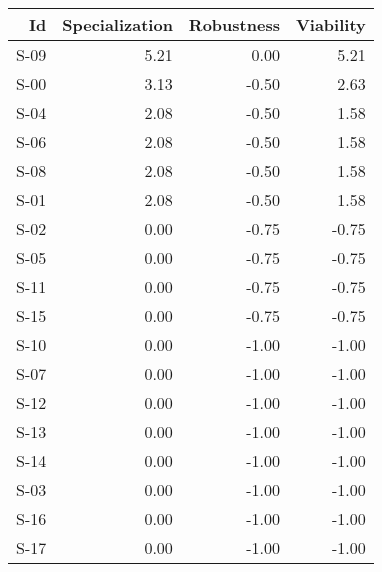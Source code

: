 \begin{tabular}{ | r | r | r | r | }
    \hline
                    Id  &  Specialization  &      Robustness  &       Viability  \\
    \hline
    \hline
                  S-09  &            5.21  &            0.00  &            5.21  \\
    \hline
                  S-00  &            3.13  &           -0.50  &            2.63  \\
    \hline
                  S-04  &            2.08  &           -0.50  &            1.58  \\
    \hline
                  S-06  &            2.08  &           -0.50  &            1.58  \\
    \hline
                  S-08  &            2.08  &           -0.50  &            1.58  \\
    \hline
                  S-01  &            2.08  &           -0.50  &            1.58  \\
    \hline
                  S-02  &            0.00  &           -0.75  &           -0.75  \\
    \hline
                  S-05  &            0.00  &           -0.75  &           -0.75  \\
    \hline
                  S-11  &            0.00  &           -0.75  &           -0.75  \\
    \hline
                  S-15  &            0.00  &           -0.75  &           -0.75  \\
    \hline
                  S-10  &            0.00  &           -1.00  &           -1.00  \\
    \hline
                  S-07  &            0.00  &           -1.00  &           -1.00  \\
    \hline
                  S-12  &            0.00  &           -1.00  &           -1.00  \\
    \hline
                  S-13  &            0.00  &           -1.00  &           -1.00  \\
    \hline
                  S-14  &            0.00  &           -1.00  &           -1.00  \\
    \hline
                  S-03  &            0.00  &           -1.00  &           -1.00  \\
    \hline
                  S-16  &            0.00  &           -1.00  &           -1.00  \\
    \hline
                  S-17  &            0.00  &           -1.00  &           -1.00  \\

\end{tabular}
